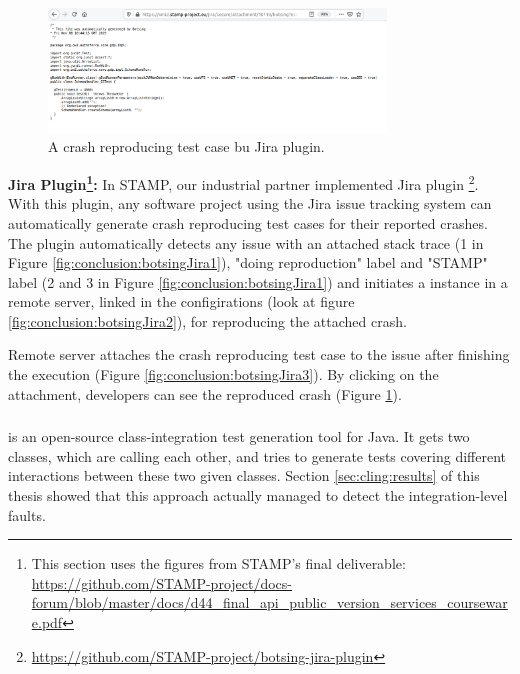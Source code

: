 \begin{figure}
    \includegraphics[width=0.8\textwidth]{conclusion/figures/deliverables_wp4_d44_images_jira-generated-test-case.png}
    \caption{A crash reproducing test case bu \botsing Jira plugin.}
    \label{fig:conclusion:botsingJira4}
\end{figure}

\textbf{\botsing Jira Plugin\footnote{This section uses the figures from STAMP's final deliverable: \url{https://github.com/STAMP-project/docs-forum/blob/master/docs/d44_final_api_public_version_services_courseware.pdf}}:}
In STAMP, our industrial partner implemented \botsing Jira plugin \footnote{\url{https://github.com/STAMP-project/botsing-jira-plugin}}.
With this plugin, any software project using the Jira issue tracking system can automatically generate crash reproducing test cases for their reported crashes. The plugin automatically detects any issue with an attached stack trace (1 in Figure \ref{fig:conclusion:botsingJira1}), "doing reproduction" label and "STAMP" label (2 and 3 in Figure \ref{fig:conclusion:botsingJira1}) and initiates a \botsing instance in a remote server, linked in the configirations (look at figure \ref{fig:conclusion:botsingJira2}), for reproducing the attached crash. 


Remote server attaches the crash reproducing test case to the issue after finishing the \botsing execution (Figure \ref{fig:conclusion:botsingJira3}). By clicking on the attachment, developers can see the reproduced crash (Figure \ref{fig:conclusion:botsingJira4}).



\subsubsection{\cling}

\cling is an open-source class-integration test generation tool for Java. It gets two classes, which are calling each other, and tries to generate tests covering different interactions between these two given classes. Section \ref{sec:cling:results} of this thesis showed that this approach actually managed to detect the integration-level faults. 

